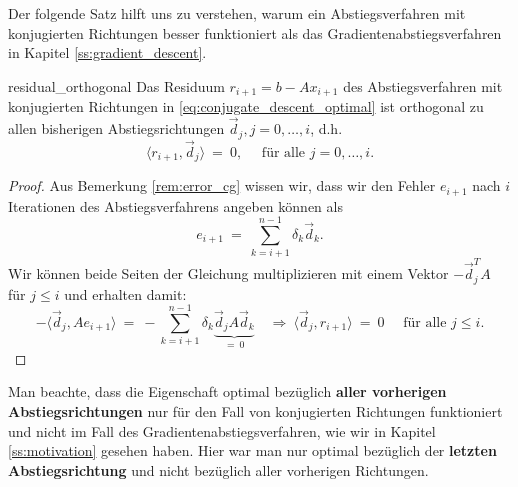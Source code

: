 Der folgende Satz hilft uns zu verstehen, warum ein Abstiegsverfahren mit konjugierten Richtungen besser funktioniert als das Gradientenabstiegsverfahren in Kapitel \eqref{ss:gradient_descent}.
\begin{theorem}{}{residual_orthogonal}
Das Residuum $r_{i+1} = b - Ax_{i+1}$ des Abstiegsverfahren mit konjugierten Richtungen in \eqref{eq:conjugate_descent_optimal} ist orthogonal zu allen bisherigen Abstiegsrichtungen $\vec{d}_j, j=0,\ldots,i$, d.h.
\begin{equation*}
\langle r_{i+1}, \vec{d}_j \rangle \ = \ 0, \quad \text{ für alle } j=0,\ldots,i. 
\end{equation*}
\end{theorem}
\begin{proof}
Aus Bemerkung \ref{rem:error_cg} wissen wir, dass wir den Fehler $e_{i+1}$ nach $i$ Iterationen des Abstiegsverfahrens angeben können als
\begin{equation*}
e_{i+1} \ = \ \sum_{k=i+1}^{n-1} \delta_k \vec{d}_k.
\end{equation*}
Wir können beide Seiten der Gleichung multiplizieren mit einem Vektor $-\vec{d}_j^TA$ für $j \leq i$ und erhalten damit:
\begin{equation*}
-\langle \vec{d}_j, Ae_{i+1} \rangle \ = \ - \sum_{k=i+1}^{n-1} \delta_k \underbrace{\vec{d}_j A\vec{d}_k}_{=~0} \quad 
\Rightarrow \ \langle \vec{d}_j, r_{i+1} \rangle \ = \ 0 \quad \text{ für alle } j \leq i.
\end{equation*}
\end{proof}
Man beachte, dass die Eigenschaft optimal bezüglich \textbf{aller vorherigen Abstiegsrichtungen} nur für den Fall von konjugierten Richtungen funktioniert und nicht im Fall des Gradientenabstiegsverfahren, wie wir in Kapitel \ref{ss:motivation} gesehen haben.
Hier war man nur optimal bezüglich der \textbf{letzten Abstiegsrichtung} und nicht bezüglich aller vorherigen Richtungen.


